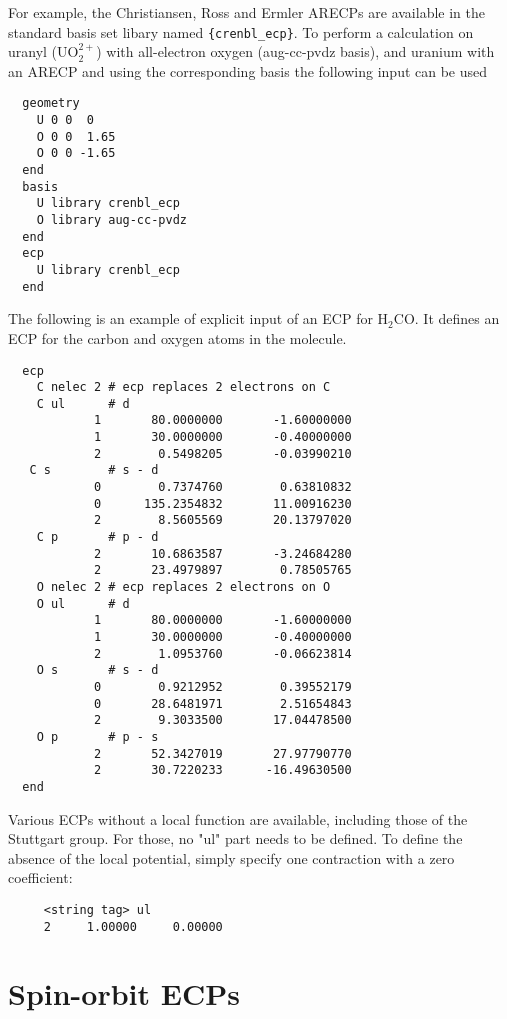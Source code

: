 For example, the Christiansen, Ross and Ermler ARECPs are available in
the standard basis set libary named \verb+{crenbl_ecp}+.  To perform a
calculation on uranyl (UO$_2^{2+}$) with all-electron oxygen
(aug-cc-pvdz basis), and uranium with an ARECP and using the
corresponding basis the following input can be used
\begin{verbatim}
  geometry
    U 0 0  0
    O 0 0  1.65
    O 0 0 -1.65
  end
  basis 
    U library crenbl_ecp
    O library aug-cc-pvdz
  end
  ecp
    U library crenbl_ecp
  end
\end{verbatim}

The following is an example of explicit input of an ECP for H$_2$CO.
It defines an ECP for the carbon and oxygen atoms in the molecule.


\begin{verbatim}
  ecp
    C nelec 2 # ecp replaces 2 electrons on C
    C ul      # d
            1       80.0000000       -1.60000000
            1       30.0000000       -0.40000000
            2        0.5498205       -0.03990210
   C s        # s - d 
            0        0.7374760        0.63810832
            0      135.2354832       11.00916230
            2        8.5605569       20.13797020
    C p       # p - d
            2       10.6863587       -3.24684280
            2       23.4979897        0.78505765
    O nelec 2 # ecp replaces 2 electrons on O
    O ul      # d 
            1       80.0000000       -1.60000000
            1       30.0000000       -0.40000000
            2        1.0953760       -0.06623814
    O s       # s - d
            0        0.9212952        0.39552179
            0       28.6481971        2.51654843
            2        9.3033500       17.04478500
    O p       # p - s 
            2       52.3427019       27.97790770
            2       30.7220233      -16.49630500
  end
\end{verbatim}

Various ECPs without a local function are available, including those of 
the Stuttgart group. For those, no "ul" part needs to be defined. To 
define the absence of the local potential, simply specify one contraction
with a zero coefficient:

\begin{verbatim}
     <string tag> ul
     2     1.00000     0.00000
\end{verbatim}

\section{Spin-orbit ECPs}
\label{sec:spinorb_ecp}

